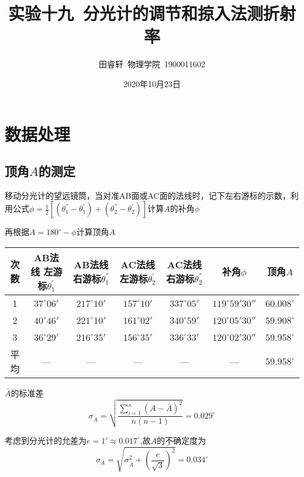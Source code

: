 \documentclass{article}
\title{\heiti 实验十九\ 分光计的调节和掠入法测折射率}
\author{\kaishu 田睿轩\ 物理学院\ 1900011602}
\date{2020年10月23日}
\newcommand{\degree}{^\circ}
\begin{document}
    \maketitle
    
    \section{数据处理}
    
    \subsection{顶角$A$的测定}
    移动分光计的望远镜筒，当对准AB面或AC面的法线时，记下左右游标的示数，利用公式$\phi=\frac{1}{2}[(\theta_1^{''}-\theta_1^{'})+(\theta_2^{''}-\theta_2^{'})]$计算$A$的补角$\phi$

    再根据$A=180\degree-\phi$计算顶角$A$

    \begin{center}
    \begin{tabular}{|c|c|c|c|c|c|c|}
        \hline
        次数 & \makecell[c]{AB法线\\左游标$\theta_1^{'}$} & \makecell[c]{AB法线\\右游标$\theta_1^{''}$} & \makecell[c]{AC法线\\左游标$\theta_2^{'}$} & \makecell[c]{AC法线\\右游标$\theta_2^{''}$} & 补角$\phi$ & 顶角$A$ \\
        \hline
        1 & $37\degree06'$ & $217\degree10'$ & $157\degree10'$ & $337\degree05'$ & $119\degree59'30''$ & $60.008\degree$ \\
        \hline
        2 & $40\degree46'$ & $221\degree10'$ & $161\degree02'$ & $340\degree59'$ & $120\degree05'30''$ & $59.908\degree$ \\
        \hline
        3 & $36\degree29'$ & $216\degree35'$ & $156\degree35'$ & $336\degree33'$ & $120\degree02'30''$ & $59.958\degree$ \\
        \hline
        平均 & --- & --- & --- & --- & --- & $59.958\degree$ \\
        \hline
    \end{tabular}
    \end{center}

    $\bar{A}$的标准差$$\sigma_{\bar{A}}=\sqrt{\frac{\sum_{i=1}^n (A-\bar A)^2}{n(n-1)}}=0.029\degree$$

    考虑到分光计的允差为$e=1'\approx0.017\degree$,故$A$的不确定度为$$\sigma_A = \sqrt{\sigma_{\bar{A}}^2 + (\frac{e}{\sqrt{3}})^2} = 0.034\degree$$
\end{document}
